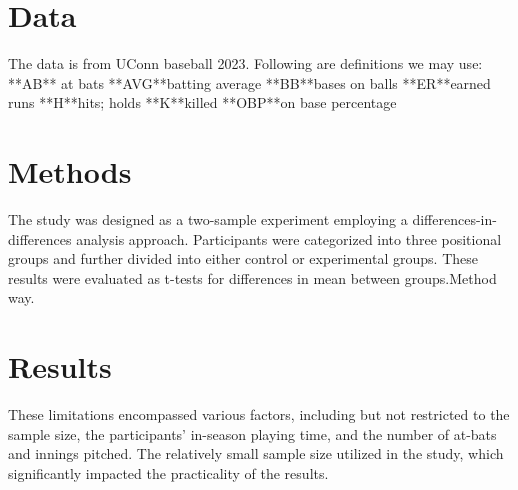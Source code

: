 \documentclass[12pt]{article}
\begin{document}
\section{Data}
\label{sec:data}
The data is from UConn baseball 2023. Following are definitions we may use:
**AB** at bats 
**AVG**batting average 
**BB**bases on balls 
**ER**earned runs
**H**hits; holds
**K**killed 
**OBP**on base percentage



\section{Methods}
\label{sec:meth}
The study was designed as a two-sample experiment employing a differences-in-differences analysis approach.
Participants were categorized into three positional groups and further divided into either control or experimental groups. 
These results were evaluated as t-tests for differences in mean between groups.Method way\citep[e.g.,][]{Dalmass2018baseball}.



\section{Results}
\label{sec:resu}
These limitations encompassed various factors, including but not restricted to the sample size, the participants' in-season playing time,
and the number of at-bats and innings pitched. The relatively small sample size utilized in the study, which significantly impacted the practicality of the results.





\end{document}
